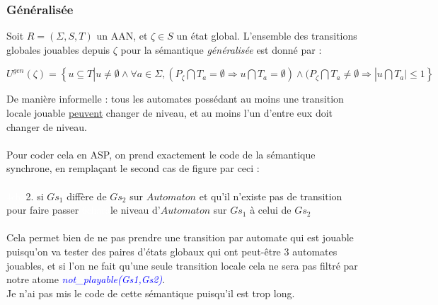 \documentclass[10pt,a4paper]{article}
\begin{document}
\subsubsection{Généralisée}
Soit $R = (\Sigma,S,T)$ un AAN, et $\zeta\in S$ un état global. L'ensemble des transitions globales jouables depuis $\zeta$ pour la sémantique \emph{généralisée} est donné par :
\begin{center}
	$U^{gen}(\zeta)=\left\{u\subseteq T|u \neq \emptyset \wedge \forall a\in\Sigma,(P_{\zeta}\bigcap T_a = \emptyset \Rightarrow u\bigcap 
	T_a=\emptyset)\wedge(P_{\zeta}\bigcap T_a\neq\emptyset\Rightarrow |u\bigcap T_a |\leq 1\right\}$
\end{center}
De manière informelle : tous les automates possédant au moins une transition locale jouable \underline{peuvent} changer de niveau, et au moins l'un d'entre eux doit changer de niveau.\\ \\
Pour coder cela en ASP, on prend exactement le code de la sémantique synchrone, en remplaçant le second cas de figure par ceci :\\ \\
\textcolor{white}{4cha}2. si $Gs_1$ diffère de $Gs_2$ sur $Automaton$ et qu'il n'existe pas de transition pour faire passer 
\textcolor{white}{6chara}le niveau d'$Automaton$ sur $Gs_1$ à celui de $Gs_2$\\ \\
Cela permet bien de ne pas prendre une transition par automate qui est jouable puisqu'on va tester des paires d'états globaux qui ont peut-être 3 automates jouables, et si l'on ne fait qu'une seule transition locale cela ne sera pas 
filtré par notre atome \emph{\textcolor{blue}{not\_playable(Gs1,Gs2)}}.\\
Je n'ai pas mis le code de cette sémantique puisqu'il est trop long.
\end{document}
